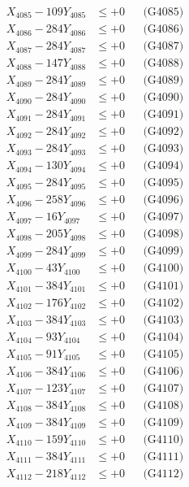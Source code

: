 \documentclass[a4paper,10pt]{article}
\begin{document}
{\begin{align}
X_{4085} - 109Y_{4085} &\leq +0 && \text{(G4085)} \\
X_{4086} - 284Y_{4086} &\leq +0 && \text{(G4086)} \\
X_{4087} - 284Y_{4087} &\leq +0 && \text{(G4087)} \\
X_{4088} - 147Y_{4088} &\leq +0 && \text{(G4088)} \\
X_{4089} - 284Y_{4089} &\leq +0 && \text{(G4089)} \\
X_{4090} - 284Y_{4090} &\leq +0 && \text{(G4090)} \\
\allowbreak
X_{4091} - 284Y_{4091} &\leq +0 && \text{(G4091)} \\
X_{4092} - 284Y_{4092} &\leq +0 && \text{(G4092)} \\
X_{4093} - 284Y_{4093} &\leq +0 && \text{(G4093)} \\
X_{4094} - 130Y_{4094} &\leq +0 && \text{(G4094)} \\
X_{4095} - 284Y_{4095} &\leq +0 && \text{(G4095)} \\
X_{4096} - 258Y_{4096} &\leq +0 && \text{(G4096)} \\
X_{4097} - 16Y_{4097} &\leq +0 && \text{(G4097)} \\
X_{4098} - 205Y_{4098} &\leq +0 && \text{(G4098)} \\
X_{4099} - 284Y_{4099} &\leq +0 && \text{(G4099)} \\
X_{4100} - 43Y_{4100} &\leq +0 && \text{(G4100)} \\
\allowbreak
X_{4101} - 384Y_{4101} &\leq +0 && \text{(G4101)} \\
X_{4102} - 176Y_{4102} &\leq +0 && \text{(G4102)} \\
X_{4103} - 384Y_{4103} &\leq +0 && \text{(G4103)} \\
X_{4104} - 93Y_{4104} &\leq +0 && \text{(G4104)} \\
X_{4105} - 91Y_{4105} &\leq +0 && \text{(G4105)} \\
X_{4106} - 384Y_{4106} &\leq +0 && \text{(G4106)} \\
X_{4107} - 123Y_{4107} &\leq +0 && \text{(G4107)} \\
X_{4108} - 384Y_{4108} &\leq +0 && \text{(G4108)} \\
X_{4109} - 384Y_{4109} &\leq +0 && \text{(G4109)} \\
X_{4110} - 159Y_{4110} &\leq +0 && \text{(G4110)} \\
\allowbreak
X_{4111} - 384Y_{4111} &\leq +0 && \text{(G4111)} \\
X_{4112} - 218Y_{4112} &\leq +0 && \text{(G4112)} \\

\end{align}}
\end{document}
